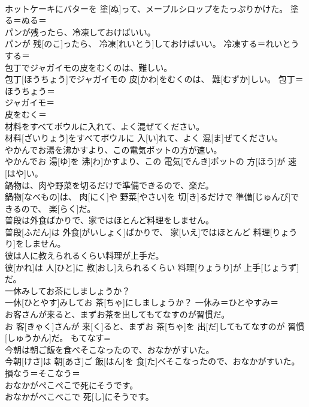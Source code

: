 \documentclass[8pt]{extreport}
\begin{document}
\begin{CJK}{UTF8}{min}
\\	ホットケーキにバターを 塗[ぬ]って、メープルシロップをたっぷりかけた。	塗る＝ぬる＝ 
\\	パンが残ったら、冷凍しておけばいい。	
\\	パンが 残[のこ]ったら、 冷凍[れいとう]しておけばいい。	冷凍する＝れいとうする＝ 
\\	包丁でジャガイモの皮をむくのは、難しい。	
\\	包丁[ほうちょう]でジャガイモの 皮[かわ]をむくのは、 難[むずか]しい。	包丁＝ほうちょう＝ 
\\	ジャガイモ＝ 
\\	皮をむく＝ 
\\	材料をすべてボウルに入れて、よく混ぜてください。	
\\	材料[ざいりょう]をすべてボウルに 入[い]れて、よく 混[ま]ぜてください。	
\\	やかんでお湯を沸かすより、この電気ポットの方が速い。	
\\	やかんでお 湯[ゆ]を 沸[わ]かすより、この 電気[でんき]ポットの 方[ほう]が 速[はや]い。	
\\	鍋物は、肉や野菜を切るだけで準備できるので、楽だ。	
\\	鍋物[なべもの]は、 肉[にく]や 野菜[やさい]を 切[き]るだけで 準備[じゅんび]できるので、 楽[らく]だ。	
\\	普段は外食ばかりで、家ではほとんど料理をしません。	
\\	普段[ふだん]は 外食[がいしょく]ばかりで、 家[いえ]ではほとんど 料理[りょうり]をしません。	
\\	彼は人に教えられるくらい料理が上手だ。	
\\	彼[かれ]は 人[ひと]に 教[おし]えられるくらい 料理[りょうり]が 上手[じょうず]だ。	
\\	一休みしてお茶にしましょうか？	
\\	一休[ひとやす]みしてお 茶[ちゃ]にしましょうか？	一休み＝ひとやすみ＝ 
\\	お客さんが来ると、まずお茶を出してもてなすのが習慣だ。	
\\	お 客[きゃく]さんが 来[く]ると、まずお 茶[ちゃ]を 出[だ]してもてなすのが 習慣[しゅうかん]だ。	もてなす= 
\\	今朝は朝ご飯を食べそこなったので、おなかがすいた。	
\\	今朝[けさ]は 朝[あさ]ご 飯[はん]を 食[た]べそこなったので、おなかがすいた。	損なう＝そこなう＝ 
\\	おなかがぺこぺこで死にそうです。	
\\	おなかがぺこぺこで 死[し]にそうです。	

\end{CJK}
\end{document}

